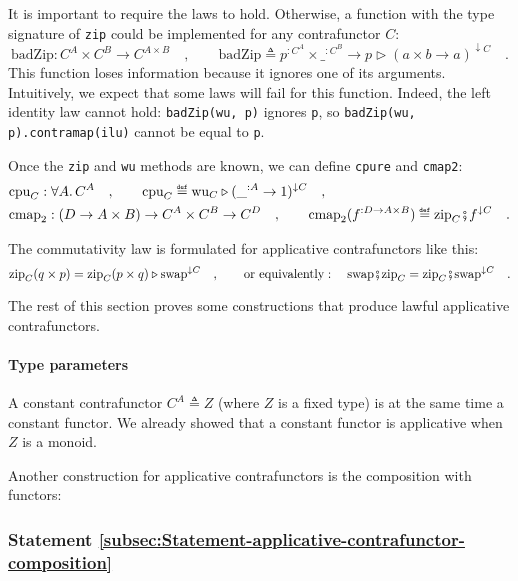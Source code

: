 It is important to require the laws to hold. Otherwise, a function
with the type signature of \lstinline!zip! could be implemented for
any contrafunctor $C$:
\[
\text{badZip}:C^{A}\times C^{B}\rightarrow C^{A\times B}\quad,\quad\quad\text{badZip}\triangleq p^{:C^{A}}\times\_^{:C^{B}}\rightarrow p\triangleright(a\times b\rightarrow a)^{\downarrow C}\quad.
\]
This function loses information because it ignores one of its arguments.
Intuitively, we expect that some laws will fail for this function.
Indeed, the left identity law cannot hold: \lstinline!badZip(wu, p)!
ignores \lstinline!p!, so \lstinline!badZip(wu, p).contramap(ilu)!
cannot be equal to \lstinline!p!. 

Once the \lstinline!zip! and \lstinline!wu! methods are known, we
can define \lstinline!cpure! and \lstinline!cmap2!:
\begin{align*}
 & \text{cpu}_{C}:\forall A.\,C^{A}\quad,\quad\quad\text{cpu}_{C}\triangleq\text{wu}_{C}\triangleright(\_^{:A}\rightarrow1)^{\downarrow C}\quad,\\
 & \text{cmap}_{2}:(D\rightarrow A\times B)\rightarrow C^{A}\times C^{B}\rightarrow C^{D}\quad,\quad\quad\text{cmap}_{2}(f^{:D\rightarrow A\times B})\triangleq\text{zip}_{C}\bef f^{\downarrow C}\quad.
\end{align*}

The commutativity law is formulated for applicative contrafunctors
like this:
\[
\text{zip}_{C}(q\times p)=\text{zip}_{C}(p\times q)\triangleright\text{swap}^{\downarrow C}\quad,\quad\quad\text{or equivalently}:\quad\text{swap}\bef\text{zip}_{C}=\text{zip}_{C}\bef\text{swap}^{\downarrow C}\quad.
\]

The rest of this section proves some constructions that produce lawful
applicative contrafunctors.

\paragraph{Type parameters}

A constant contrafunctor $C^{A}\triangleq Z$ (where $Z$ is a fixed
type) is at the same time a constant functor. We already showed that
a constant functor is applicative when $Z$ is a monoid. 

Another construction for applicative contrafunctors is the composition
with functors:

\subsubsection{Statement \label{subsec:Statement-applicative-contrafunctor-composition}\ref{subsec:Statement-applicative-contrafunctor-composition}}

